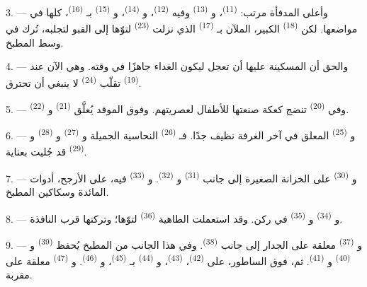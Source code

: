 3. --- وأعلى المدفأة مرتب:  \textsuperscript{(11)}،
و \textsuperscript{(13)} وفيه 
\textsuperscript{(12)}، و \textsuperscript{(14)}،
و \textsuperscript{(15)} بـ \textsuperscript{(16)}،
كلها في مواضعها. لكن  \textsuperscript{(18)} الكبير، الملآن
بـ \textsuperscript{(17)} الذي نزلت 
\textsuperscript{(23)} لتوّها إلى القبو لتجلبه، تُرك في وسط المطبخ.

4. --- والحق أن المسكينة عليها أن تعجل ليكون الغداء جاهزًا في وقته. وهي
الآن عند  \textsuperscript{(19)} تقلّب 
\textsuperscript{(24)} لا ينبغي أن تحترق.

5. --- وفي  \textsuperscript{(20)} تنضج كعكة صنعتها للأطفال
لعصريتهم. وفوق الموقد يُعلَّق  \textsuperscript{(21)}
و \textsuperscript{(22)}.

\VUsaut{4.0mm}
\VUsaut{3.0mm}

6. --- و \textsuperscript{(25)} المعلق في آخر الغرفة نظيف
جدًا. فـ \textsuperscript{(26)} النحاسية الجميلة
و \textsuperscript{(27)} و \textsuperscript{(28)}
و \textsuperscript{(29)} قد جُليت بعناية.

7. --- و \textsuperscript{(30)} على الخزانة الصغيرة إلى جانب
 \textsuperscript{(31)} و \textsuperscript{(32)}.
و \textsuperscript{(33)} فيه، على الأرجح، أدوات المائدة وسكاكين
المطبخ.

8. --- و \textsuperscript{(34)} و
\textsuperscript{(35)} في ركن. وقد استعملت الطاهية 
\textsuperscript{(36)} لتوّها؛ وتركتها قرب النافذة.

9. --- و \textsuperscript{(37)} معلقة على الجدار إلى جانب
 \textsuperscript{(38)}. وفي هذا الجانب من المطبخ يُحفظ
 \textsuperscript{(39)} و \textsuperscript{(40)}
و \textsuperscript{(41)}. ثم، فوق الساطور، على
 \textsuperscript{(42)}،  \textsuperscript{(43)}،
و \textsuperscript{(44)} بـ \textsuperscript{(45)}،
و \textsuperscript{(46)}. و \textsuperscript{(47)}
معلقة على مقربة.

